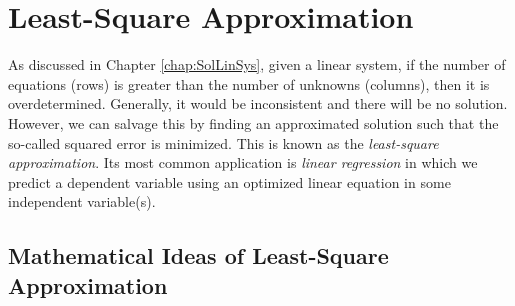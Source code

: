 \chapter{Least-Square Approximation}
\label{chap:leastsq}

As discussed in Chapter \ref{chap:SolLinSys}, given a linear system, if the number of equations (rows) is greater than the number of unknowns (columns), then it is overdetermined. Generally, it would be inconsistent and there will be no solution. However, we can salvage this by finding an approximated solution such that the so-called squared error is minimized. This is known as the \textit{least-square approximation}. Its most common application is \textit{linear regression} in which we predict a dependent variable using an optimized linear equation in some independent variable(s).

\section{Mathematical Ideas of Least-Square Approximation}

